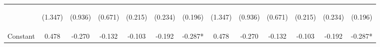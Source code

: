 \documentclass[]{article}
\begin{document}
\begin{center}
\begin{tabular}{lcccccccccccc}
\vspace{4pt} & \begin{footnotesize}(1.347)\end{footnotesize} & \begin{footnotesize}(0.936)\end{footnotesize} & \begin{footnotesize}(0.671)\end{footnotesize} & \begin{footnotesize}(0.215)\end{footnotesize} & \begin{footnotesize}(0.234)\end{footnotesize} & \begin{footnotesize}(0.196)\end{footnotesize} & \begin{footnotesize}(1.347)\end{footnotesize} & \begin{footnotesize}(0.936)\end{footnotesize} & \begin{footnotesize}(0.671)\end{footnotesize} & \begin{footnotesize}(0.215)\end{footnotesize} & \begin{footnotesize}(0.234)\end{footnotesize} & \begin{footnotesize}(0.196)\end{footnotesize} \\
Constant & 0.478 & -0.270 & -0.132 & -0.103 & -0.192 & -0.287* & 0.478 & -0.270 & -0.132 & -0.103 & -0.192 & -0.287* \\

\end{tabular}
\end{center}
\end{document}
